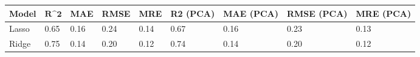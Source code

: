 \begin{table}
\centering
\label{table:iri_reg_pred}
\begin{tabular}{lllllllll}
\toprule
\textbf{Model} & $\textbf{R^2}$ & \textbf{MAE} & \textbf{RMSE} & \textbf{MRE} & \textbf{R2 (PCA)} & \textbf{MAE (PCA)} & \textbf{RMSE (PCA)} & \textbf{MRE (PCA)} \\
\midrule
         Lasso &           0.65 &         0.16 &          0.24 &         0.14 &              0.67 &               0.16 &                0.23 &               0.13 \\
         Ridge &           0.75 &         0.14 &          0.20 &         0.12 &              0.74 &               0.14 &                0.20 &               0.12 \\
\bottomrule
\end{tabular}
\end{table}
